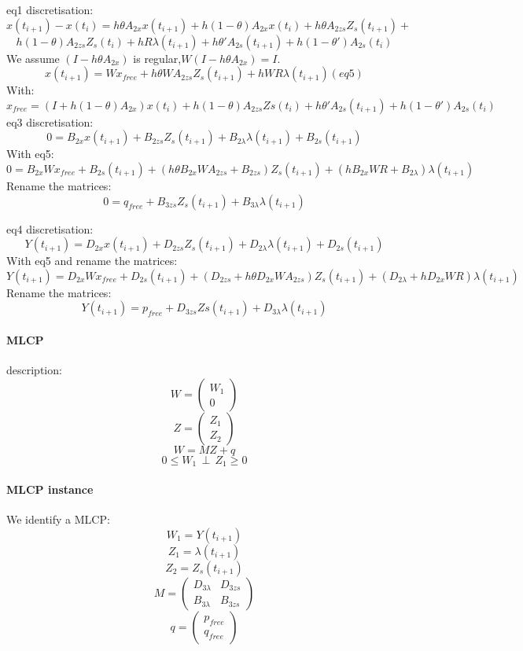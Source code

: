 \documentclass[10pt]{article}
\begin{document}
 eq1 discretisation:
\[x(t_{i+1}) - x(t_{i})=h\theta A_{2x}x(t_{i+1})+h(1-\theta)A_{2x}x(t_{i}) +h\theta
A_{2zs}Z_{s}(t_{i+1}) +\]
\[h(1-\theta)A_{2zs}Z_s(t_{i}) +hR\lambda (t_{i+1}) + h\theta 'A_{2s}(t_{i+1}) +
h(1-\theta ')A_{2s}(t_{i})\]
We assume $(I-h\theta A_{2x})$ is regular,$W(I-h\theta A_{2x}) = I.$
\[x(t_{i+1})=Wx_{free}+h\theta WA_{2zs}Z_{s}(t_{i+1})+hWR\lambda (t_{i+1})  (eq5)\]
With:
\[x_{free}=(I+h(1-\theta)A_{2x})x(t_{i}) + h(1-\theta )A_{2zs}Zs(t_{i}) + h\theta 'A_{2s}(t_{i+1}) +
h(1-\theta ')A_{2s}(t_{i})\]
eq3 discretisation:
\[0 = B_{2x}x(t_{i+1})+B_{2zs}Z_{s}(t_{i+1}) + B_{2\lambda}\lambda(t_{i+1})+B_{2s}(t_{i+1})\]
With eq5:
\[0 = B_{2x}Wx_{free}+B_{2s}(t_{i+1})+(h\theta B_{2x} WA_{2zs}+B_{2zs}) Z_{s}(t_{i+1})+(hB_{2x}WR+B_{2\lambda})\lambda(t_{i+1})\]
Rename the matrices:
\[0 = q_{free}+B_{3zs} Z_{s}(t_{i+1})+B_{3\lambda}\lambda(t_{i+1})\]

eq4 discretisation:
\[Y(t_{i+1})=D_{2x}x(t_{i+1})+D_{2zs}Z_{s}(t_{i+1}) +D_{2\lambda}\lambda(t_{i+1})+D_{2s}(t_{i+1})\]
With eq5 and rename the matrices:
\[Y(t_{i+1})=D_{2x}Wx_{free}+ D_{2s}(t_{i+1})+(D_{2zs}+h\theta
D_{2x}WA_{2zs})Z_{s}(t_{i+1})+(D_{2\lambda} + hD_{2x}WR)\lambda(t_{i+1})\]
Rename the matrices:
\[Y(t_{i+1})=p_{free}+D_{3zs}Zs(t_{i+1}) +D_{3\lambda}\lambda (t_{i+1})\]

\paragraph{MLCP}
description:\\

\[W=\left(\begin{array}{c}W_{1}\\0\end{array}\right)\]
\[Z=\left(\begin{array}{c}Z_{1}\\Z_{2}\end{array}\right)\]
\[W=MZ+q\]
\[0 \leq W_{1} \, \perp \, Z_{1} \geq 0\]
\paragraph{MLCP instance}
We identify a MLCP:\\
\[W_{1} = Y(t_{i+1})\]
\[Z_{1} = \lambda(t_{i+1})\]
\[Z_{2} = Z_{s}(t_{i+1})\]
\[M = \left(\begin{array}{cc}
  D_{3\lambda}&D_{3zs}\\
B_{3\lambda}&B_{3zs}
\end{array}\right)\]
\[q=\left(\begin{array}{c}
p_{free}\\
q_{free}\end{array}\right)\]
\newpage
\end{document}
